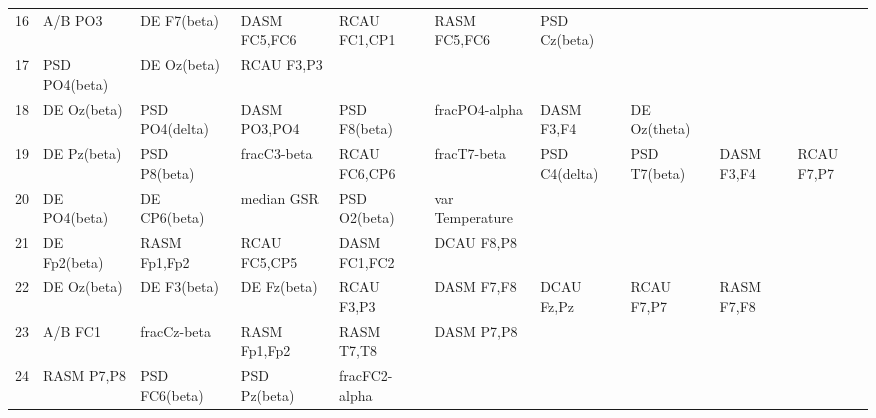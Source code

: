 \begin{landscape}
\begin{table}[]
\begin{tabular}{l|llllllll}
16       & A/B PO3               & DE F7(beta)           & DASM FC5,FC6         & RCAU FC1,CP1            & RASM FC5,FC6            & PSD Cz(beta)         &                      &                       &                       &                    \\
17       & PSD PO4(beta)         & DE Oz(beta)           & RCAU F3,P3           &                         &                         &                      &                      &                       &                       &                    \\
18       & DE Oz(beta)           & PSD PO4(delta)        & DASM PO3,PO4         & PSD F8(beta)            & fracPO4-alpha           & DASM F3,F4           & DE Oz(theta)         &                       &                       &                    \\
19       & DE Pz(beta)           & PSD P8(beta)          & fracC3-beta          & RCAU FC6,CP6            & fracT7-beta             & PSD C4(delta)        & PSD T7(beta)         & DASM F3,F4            & RCAU F7,P7            &                    \\
20       & DE PO4(beta)          & DE CP6(beta)          & median GSR           & PSD O2(beta)            & var Temperature         &                      &                      &                       &                       &                    \\
21       & DE Fp2(beta)          & RASM Fp1,Fp2          & RCAU FC5,CP5         & DASM FC1,FC2            & DCAU F8,P8              &                      &                      &                       &                       &                    \\
22       & DE Oz(beta)           & DE F3(beta)           & DE Fz(beta)          & RCAU F3,P3              & DASM F7,F8              & DCAU Fz,Pz           & RCAU F7,P7           & RASM F7,F8            &                       &                    \\
23       & A/B FC1               & fracCz-beta           & RASM Fp1,Fp2         & RASM T7,T8              & DASM P7,P8              &                      &                      &                       &                       &                    \\
24       & RASM P7,P8            & PSD FC6(beta)         & PSD Pz(beta)         & fracFC2-alpha           &                         &                      &                      &                       &                       &                    \\

\end{tabular}
\end{table}
\end{landscape}
